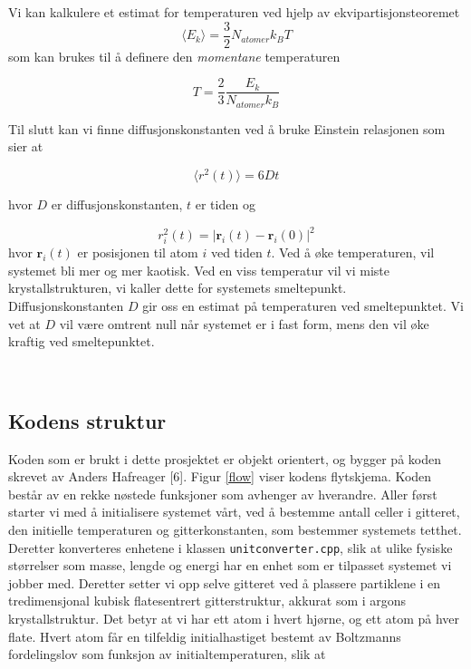 \documentclass[paper=a4, fontsize=11pt]{scrartcl} %
\numberwithin{equation}{section} %
\numberwithin{figure}{section} %
\numberwithin{table}{section} %
\begin{document}
Vi kan kalkulere et estimat for temperaturen ved hjelp av ekvipartisjonsteoremet 
\begin{equation}
\langle E_k \rangle = \frac{3}{2}N_{atomer} k_B T
\end{equation}
som kan brukes til å definere den \textit{momentane} temperaturen

\begin{equation}
T = \frac{2}{3}\frac{E_k}{N_{atomer} k_B}
\end{equation}

Til slutt kan vi finne diffusjonskonstanten ved å bruke Einstein relasjonen som sier at

\begin{equation}
\langle r^2(t) \rangle = 6 D t
\end{equation}

hvor $D$ er diffusjonskonstanten, $t$ er tiden og

\begin{equation}
r_i^2 (t) = | \textbf{r}_i (t) - \textbf{r}_i (0) |^2
\end{equation} 
hvor $\textbf{r}_i (t)$ er posisjonen til atom $i$ ved tiden $t$. Ved å øke temperaturen, vil systemet bli mer og mer kaotisk. Ved en viss temperatur vil vi miste krystallstrukturen, vi kaller dette for systemets smeltepunkt. Diffusjonskonstanten $D$ gir oss en estimat på temperaturen ved smeltepunktet. Vi vet at $D$ vil være omtrent null når systemet er i fast form, mens den vil øke kraftig ved smeltepunktet. 

\\



\subsection{Kodens struktur}
Koden som er brukt i dette prosjektet er objekt orientert, og bygger på koden skrevet av Anders Hafreager [6]. Figur \ref{flow} viser kodens flytskjema. Koden består av en rekke nøstede funksjoner som avhenger av hverandre. Aller først starter vi med å initialisere systemet vårt, ved å bestemme antall celler i gitteret, den initielle temperaturen og gitterkonstanten, som bestemmer systemets tetthet. Deretter konverteres enhetene i klassen \texttt{unitconverter.cpp}, slik at ulike fysiske størrelser som masse, lengde og energi har en enhet som er tilpasset systemet vi jobber med. Deretter setter vi opp selve gitteret ved å plassere partiklene i en tredimensjonal kubisk flatesentrert gitterstruktur, akkurat som i argons krystallstruktur. Det betyr at vi har ett atom i hvert hjørne, og ett atom på hver flate. Hvert atom får en tilfeldig initialhastiget bestemt av Boltzmanns fordelingslov som funksjon av initialtemperaturen, slik at 
\end{document}
